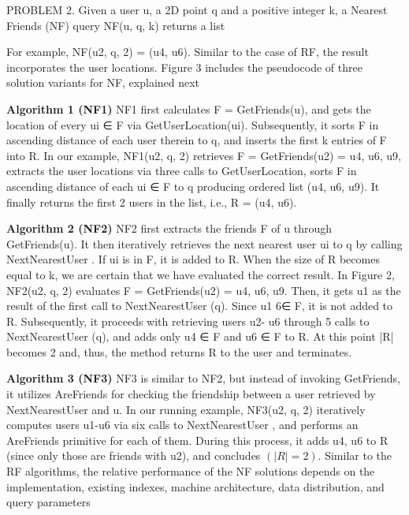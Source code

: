 \documentclass[prodmode,acmtods]{acmsmall} %
\begin{document}
PROBLEM 2. Given a user u, a 2D point q and a positive integer
k, a Nearest Friends (NF) query NF(u, q, k) returns a list

For example, NF(u2, q, 2) = (u4, u6). Similar to the case of
RF, the result incorporates the user locations. Figure 3 includes the
pseudocode of three solution variants for NF, explained next

\textbf{Algorithm 1 (NF1)}
NF1 first calculates F = GetFriends(u),
and gets the location of every ui ∈ F via GetUserLocation(ui).
Subsequently, it sorts F in ascending distance of each user therein
to q, and inserts the first k entries of F into R. In our example,
NF1(u2, q, 2) retrieves F = GetFriends(u2) = {u4, u6, u9},
extracts the user locations via three calls to GetUserLocation,
sorts F in ascending distance of each ui ∈ F to q producing ordered
list (u4, u6, u9). It finally returns the first 2 users in the list,
i.e., R = (u4, u6).

\textbf{Algorithm 2 (NF2)}
 NF2 first extracts the friends F of u through
GetFriends(u). It then iteratively retrieves the next nearest user ui
to q by calling NextNearestUser . If ui is in F, it is added to R.
When the size of R becomes equal to k, we are certain that we have
evaluated the correct result. In Figure 2, NF2(u2, q, 2) evaluates
F = GetFriends(u2) = {u4, u6, u9}. Then, it gets u1 as the
result of the first call to NextNearestUser (q). Since u1 6∈ F, it is
not added to R. Subsequently, it proceeds with retrieving users u2-
u6 through 5 calls to NextNearestUser (q), and adds only u4 ∈ F
and u6 ∈ F to R. At this point |R| becomes 2 and, thus, the
method returns R to the user and terminates.

\textbf{Algorithm 3 (NF3)}
NF3 is similar to NF2, but instead of invoking
GetFriends, it utilizes AreFriends for checking the friendship
between a user retrieved by NextNearestUser and u. In our running
example, NF3(u2, q, 2) iteratively computes users u1-u6 via
six calls to NextNearestUser , and performs an AreFriends primitive
for each of them. During this process, it adds u4, u6 to R
(since only those are friends with u2), and concludes $(|R| = 2)$.
Similar to the RF algorithms, the relative performance of the
NF solutions depends on the implementation, existing indexes, machine
architecture, data distribution, and query parameters
\end{document}

